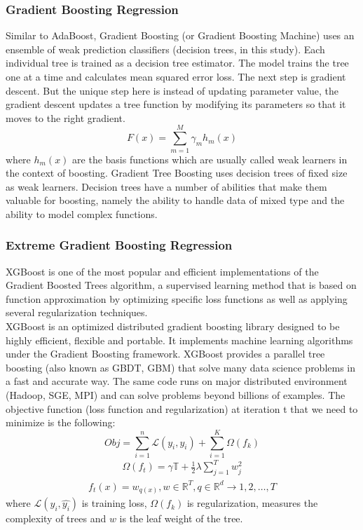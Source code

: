 \documentclass[english]{article}
\begin{document}
\subsubsection{Gradient Boosting Regression}
Similar to AdaBoost, Gradient Boosting (or Gradient Boosting Machine) uses an ensemble of weak prediction classifiers (decision trees, in this study). Each individual tree is trained as a decision tree estimator. The model trains the tree one at a time and calculates mean squared error loss. The next step is gradient descent. But the unique step here is instead of updating parameter value, the gradient descent updates a tree function by modifying its parameters so that it moves to the right gradient\cite{Gradient}.
\begin{equation}
F(x) = \sum_{m=1}^{M} \gamma_{m} h_{m}(x)
\end{equation}
where $h_{m}(x)$ are the basis functions which are usually called weak learners in the context of boosting. Gradient Tree Boosting uses decision trees of fixed size as weak learners. Decision trees have a number of abilities that make them valuable for boosting, namely the ability to handle data of mixed type and the ability to model complex functions.\cite{sklearn}
\subsubsection{Extreme Gradient Boosting Regression}
XGBoost is one of the most popular and efficient implementations of the Gradient Boosted Trees algorithm, a supervised learning method that is based on function approximation by optimizing specific loss functions as well as applying several regularization techniques.\\
XGBoost is an optimized distributed gradient boosting library designed to be highly efficient, flexible and portable. It implements machine learning algorithms under the Gradient Boosting framework. XGBoost provides a parallel tree boosting (also known as GBDT, GBM) that solve many data science problems in a fast and accurate way. The same code runs on major distributed environment (Hadoop, SGE, MPI) and can solve problems beyond billions of examples.\cite{xgboost}
The objective function (loss function and regularization) at iteration t that we need to minimize is the following:
\begin{equation}
Obj = \sum_{i=1}^{n} \mathcal{L}(y_{i}, \hat{y_{i}}) +\sum_{i=1}^{K}\Omega (f_{k})
\end{equation}
\begin{align*}
\Omega(f_{t}) = \gamma \mathbb{T} +\frac{1}{2}\lambda \sum_{j=1}^{T}w_{j}^{2}
\end{align*}
\begin{align*}
f_{t}(x) = w_{q(x)}, w \in \mathbb{R}^{T}, q\in \mathbb{R}^{d} \rightarrow {1,2,\ldots,T}
\end{align*}
where $\mathcal{L}(y_{i}, \hat{y_{i}})$ is training loss, $\Omega (f_{k})$ is regularization, measures the complexity of trees and $w$ is the leaf weight of the tree.
\end{document}
